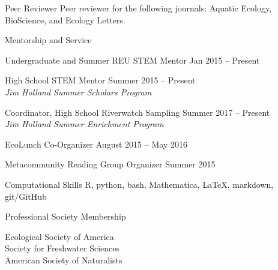 \documentclass{resume} %
\begin{document}
\begin{rSection}{Peer Reviewer}
Peer reviewer for the following journals: Aquatic Ecology, BioScience, and Ecology Letters.
\end{rSection}
\bigskip

\begin{rSection}{Mentorship and Service}

{Undergraduate and Summer REU STEM Mentor} \hfill Jan 2015 -- Present


{High School STEM Mentor} \hfill Summer 2015 -- Present\\
{\em Jim Holland Summer Scholars Program}
 

{Coordinator, High School Riverwatch Sampling} \hfill Summer 2017 -- Present\\
{\em Jim Holland Summer Enrichment Program}

{EcoLunch Co-Organizer} \hfill August 2015 -- May 2016

{Metacommunity Reading Group Organizer} \hfill Summer 2015

\end{rSection}

\bigskip

\begin{rSection}{Computational Skills}
R, python, bash, Mathematica, \LaTeX, markdown, git/GitHub 

\end{rSection}

\bigskip

\begin{rSection}{Professional Society Membership}

Ecological Society of America\\
Society for Freshwater Sciences\\
American Society of Naturalists\\ 

\end{rSection}
\end{document}
